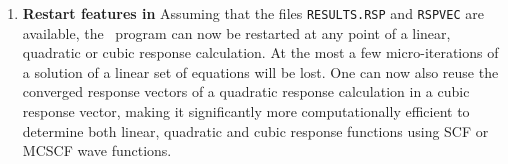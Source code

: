 \begin{enumerate}

\item {\bf Restart features in \resp } Assuming that the files
\verb|RESULTS.RSP| and \verb|RSPVEC| are available, the \resp\ program
can now be restarted at any point of a linear, quadratic or cubic
response calculation. At the most a few micro-iterations of a solution
of a linear set of equations will be lost. One can now also reuse the
converged response vectors of a quadratic response calculation in a
cubic response vector, making it significantly more computationally
efficient to determine both linear, quadratic and cubic response
functions using SCF or MCSCF wave functions.
\end{enumerate}

